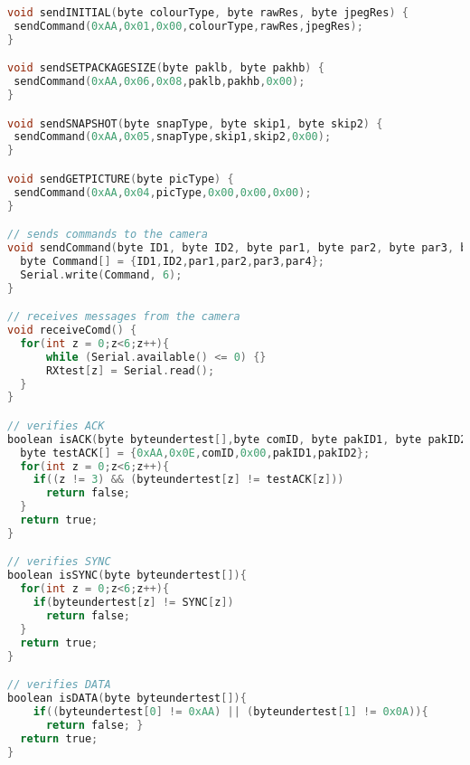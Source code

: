 \begin{lstlisting}[language=C, label = lst:arduino_captureTest, caption = {Arduino code, used up until the point we started using the Il Matto. This was written in the arduino-022 IDE}]
void sendINITIAL(byte colourType, byte rawRes, byte jpegRes) {
 sendCommand(0xAA,0x01,0x00,colourType,rawRes,jpegRes);
}

void sendSETPACKAGESIZE(byte paklb, byte pakhb) {
 sendCommand(0xAA,0x06,0x08,paklb,pakhb,0x00);
}

void sendSNAPSHOT(byte snapType, byte skip1, byte skip2) {
 sendCommand(0xAA,0x05,snapType,skip1,skip2,0x00);
}

void sendGETPICTURE(byte picType) {
 sendCommand(0xAA,0x04,picType,0x00,0x00,0x00);
}

// sends commands to the camera
void sendCommand(byte ID1, byte ID2, byte par1, byte par2, byte par3, byte par4) {
  byte Command[] = {ID1,ID2,par1,par2,par3,par4};
  Serial.write(Command, 6);
}

// receives messages from the camera
void receiveComd() {
  for(int z = 0;z<6;z++){
      while (Serial.available() <= 0) {}
      RXtest[z] = Serial.read();
  }
}

// verifies ACK
boolean isACK(byte byteundertest[],byte comID, byte pakID1, byte pakID2){
  byte testACK[] = {0xAA,0x0E,comID,0x00,pakID1,pakID2};
  for(int z = 0;z<6;z++){
    if((z != 3) && (byteundertest[z] != testACK[z]))
      return false;
  }
  return true;
}

// verifies SYNC
boolean isSYNC(byte byteundertest[]){
  for(int z = 0;z<6;z++){
    if(byteundertest[z] != SYNC[z])
      return false;
  }
  return true;
}

// verifies DATA
boolean isDATA(byte byteundertest[]){
    if((byteundertest[0] != 0xAA) || (byteundertest[1] != 0x0A)){
      return false; }
  return true;
}
\end{lstlisting}
